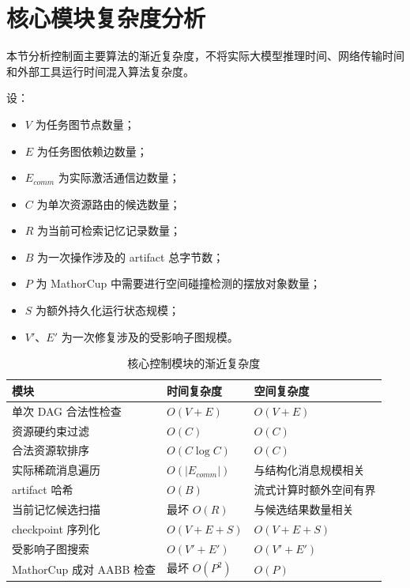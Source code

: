 \documentclass[UTF8,a4paper,12pt,oneside]{ctexbook}
\begin{document}
\section{核心模块复杂度分析}

本节分析控制面主要算法的渐近复杂度，不将实际大模型推理时间、网络传输时间和外部工具运行时间混入算法复杂度。

设：

\begin{itemize}
    \item $V$ 为任务图节点数量；
    \item $E$ 为任务图依赖边数量；
    \item $E_{comm}$ 为实际激活通信边数量；
    \item $C$ 为单次资源路由的候选数量；
    \item $R$ 为当前可检索记忆记录数量；
    \item $B$ 为一次操作涉及的 artifact 总字节数；
    \item $P$ 为 MathorCup 中需要进行空间碰撞检测的摆放对象数量；
    \item $S$ 为额外持久化运行状态规模；
    \item $V'$、$E'$ 为一次修复涉及的受影响子图规模。
\end{itemize}

\begin{table}[htbp]
\centering
\caption{核心控制模块的渐近复杂度}
\label{tab:complexity}
\begin{tabularx}{0.96\textwidth}{p{}p{}X}
\toprule
模块 & 时间复杂度 & 空间复杂度\\
\midrule

单次 DAG 合法性检查
&
$O(V+E)$
&
$O(V+E)$
\\

资源硬约束过滤
&
$O(C)$
&
$O(C)$
\\

合法资源软排序
&
$O(C\log C)$
&
$O(C)$
\\

实际稀疏消息遍历
&
$O(|E_{comm}|)$
&
与结构化消息规模相关
\\

artifact 哈希
&
$O(B)$
&
流式计算时额外空间有界
\\

当前记忆候选扫描
&
最坏 $O(R)$
&
与候选结果数量相关
\\

checkpoint 序列化
&
$O(V+E+S)$
&
$O(V+E+S)$
\\

受影响子图搜索
&
$O(V'+E')$
&
$O(V'+E')$
\\

MathorCup 成对 AABB 检查
&
最坏 $O(P^2)$
&
$O(P)$
\\

\bottomrule
\end{tabularx}
\end{table}
\end{document}
